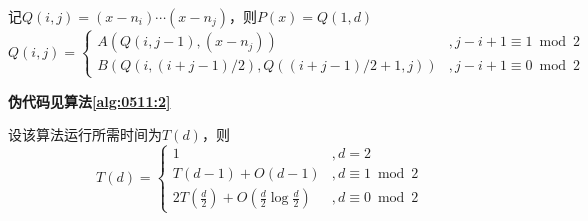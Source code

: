 \begin{questions}
\begin{solution}
        记$Q(i,j) = (x-n_i) \cdots (x-n_j)$，则$P(x) = Q(1,d)$
        \[
            Q(i,j) = \begin{cases}
                A(Q(i,j-1), (x-n_j))                 & , j-i+1 \equiv 1 \bmod 2 \\
                B(Q(i,(i+j-1)/2), Q((i+j-1)/2+1, j)) & , j-i+1 \equiv 0 \bmod 2
            \end{cases}
        \]

        \textbf{伪代码见算法\ref{alg:0511:2}}

        \newcommand{\pp}[1]{ \left( #1 \right) }
        \newcommand{\pb}[1]{ \left[ #1 \right] }
        \newcommand{\pT}[1]{ T\left( #1 \right) }
        \newcommand{\pO}[1]{ O\left( #1 \right) }

        设该算法运行所需时间为$T(d)$，则\[
            T(d) = \begin{cases}
                1                                                     & , d = 2              \\
                \pT{d-1} + \pO{d-1}                                   & , d \equiv 1 \bmod 2 \\
                2\pT{\frac{d}{2}} + \pO{\frac{d}{2} \log \frac{d}{2}} & , d \equiv 0 \bmod 2
            \end{cases}
        \]


\end{solution}
\end{questions}
